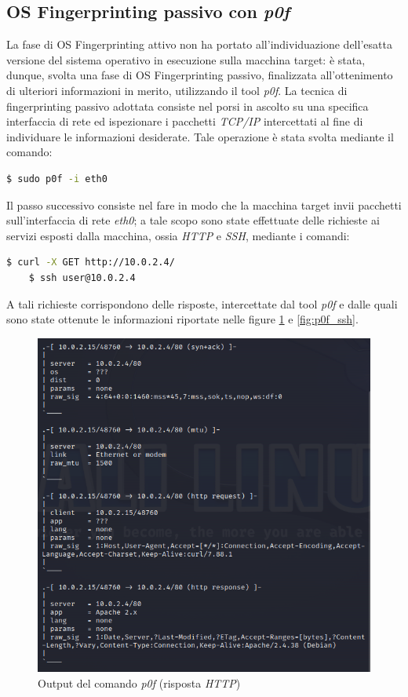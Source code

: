 \subsection{OS Fingerprinting passivo con \emph{p0f}}
La fase di OS Fingerprinting attivo non ha portato all'individuazione dell'esatta versione del sistema operativo in esecuzione sulla macchina target: è stata, dunque, svolta una fase di OS Fingerprinting passivo, finalizzata all'ottenimento di ulteriori informazioni in merito, utilizzando il tool \emph{p0f}. La tecnica di fingerprinting passivo adottata consiste nel porsi in ascolto su una specifica interfaccia di rete ed ispezionare i pacchetti \emph{TCP/IP} intercettati al fine di individuare le informazioni desiderate. Tale operazione è stata svolta mediante il comando:
\begin{lstlisting}[language=bash] 
    $ sudo p0f -i eth0 
\end{lstlisting}
Il passo successivo consiste nel fare in modo che la macchina target invii pacchetti sull'interfaccia di rete \emph{eth0}; a tale scopo sono state effettuate delle richieste ai servizi esposti dalla macchina, ossia \emph{HTTP} e \emph{SSH}, mediante i comandi:
\begin{lstlisting}[language=bash] 
    $ curl -X GET http://10.0.2.4/
    $ ssh user@10.0.2.4
\end{lstlisting}
A tali richieste corrispondono delle risposte, intercettate dal tool \emph{p0f} e dalle quali sono state ottenute le informazioni riportate nelle figure \ref{fig:p0f_http} e \ref{fig:p0f_ssh}.
\begin{figure}[h]
    \centering
    \includegraphics[scale=0.7]{capitoli/images/p0f_http.png}
    \caption{Output del comando \emph{p0f} (risposta \emph{HTTP})}
    \label{fig:p0f_http}
\end{figure}
